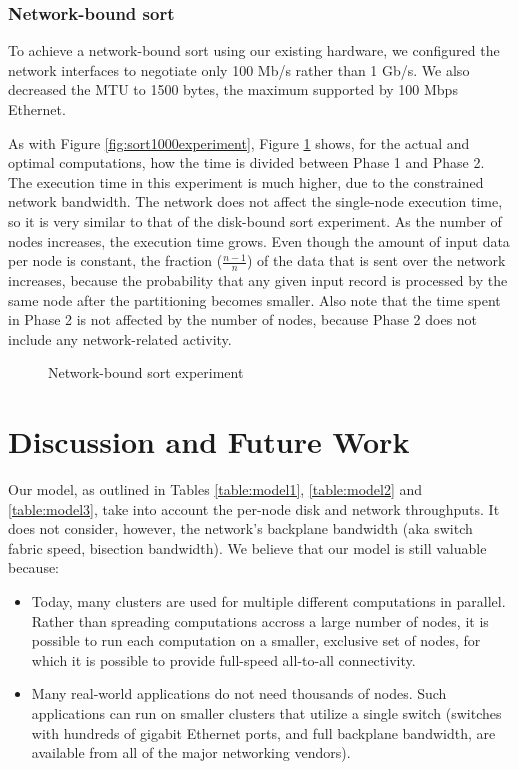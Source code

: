 \documentclass{acm_proc_article-sp}
\begin{document}
\subsubsection{Network-bound sort}

To achieve a network-bound sort using our existing hardware, we
configured the network interfaces to negotiate only 100 Mb/s rather than 1 Gb/s. We also decreased the
MTU to 1500 bytes, the maximum supported by 100 Mbps Ethernet.

As with Figure \ref{fig:sort1000experiment}, Figure \ref{fig:sort100experiment}
shows, for the actual and optimal computations, how the time is divided between Phase 1 and Phase 2. The execution time in this experiment is much higher, due to the
constrained network bandwidth. The network does not affect the single-node
execution time, so it is very similar to that of the disk-bound sort
experiment. As the number of nodes increases, the execution time
grows. Even though the amount of input data per node is constant, the fraction
($\frac{n-1}{n}$) of the data that is sent over the network increases, because
the probability that any given input record is processed by the same node after
the partitioning becomes smaller. Also note that the time spent in Phase 2 is
not affected by the number of nodes, because Phase 2 does not include any
network-related activity.

\begin{figure}
\caption{Network-bound sort experiment}
\label{fig:sort100experiment}
\end{figure}

\section{Discussion and Future Work}

Our model, as outlined in Tables \ref{table:model1}, \ref{table:model2} and
\ref{table:model3}, take into account the per-node disk and network
throughputs. It does not consider, however, the network's backplane
bandwidth (aka switch fabric speed, bisection bandwidth). We believe that our
model is still valuable because:
\begin{itemize}
  \item Today, many clusters are used for multiple different
  computations in parallel. Rather than spreading computations accross a large
  number of nodes, it is possible to run each computation on a smaller,
  exclusive set of nodes, for which it is possible to provide full-speed
  all-to-all connectivity.
  \item Many real-world applications do not need thousands of nodes. Such
  applications can run on smaller clusters that utilize a single switch
  (switches with hundreds of gigabit Ethernet ports, and full backplane
  bandwidth, are available from all of the major networking vendors).
\end{itemize}
\end{document}
